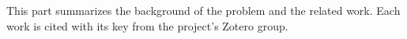 
This part summarizes the background of the problem and the related work.
Each work is cited with its key from the project's Zotero group.

